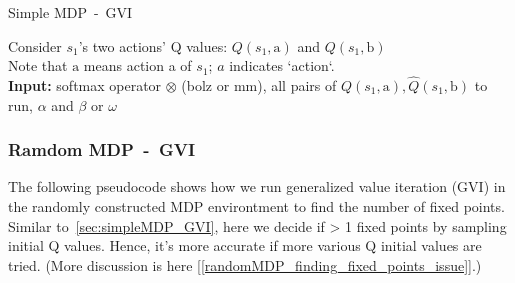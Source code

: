 \begin{algorithm}
    \caption{Simple MDP\ -\ GVI}\label{alg:SimpleMDP-GVI}
    Consider $s_1$'s two actions' Q values: $Q(s_1,\text{a})$ and $Q(s_1,\text{b})$\\
    Note that $\text{a}$ means action a of $s_1$; $a$ indicates `action`.\\
    \textbf{Input:} softmax operator $\otimes$ (bolz or mm), all pairs of $Q(s_1,\text{a}),\hat{Q}(s_1,\text{b})$ to run, $\alpha$ and $\beta$ or $\omega$
    \begin{algorithmic}[1]
          
            \Repeat{}
                \EndFor{}
        \EndFor{}
        \Else{}
        \EndIf{}
    \end{algorithmic}
\end{algorithm}


\subsubsection{Ramdom MDP\ -\ GVI}

The following pseudocode shows how we run generalized value iteration (GVI) in the randomly constructed MDP environtment to find the number of fixed points.
Similar to\ \ref{sec:simpleMDP_GVI}, here we decide if > 1 fixed points by sampling initial Q values.
Hence, it's more accurate if more various Q initial values are tried.
(More discussion is here [\ref{randomMDP_finding_fixed_points_issue}].)

